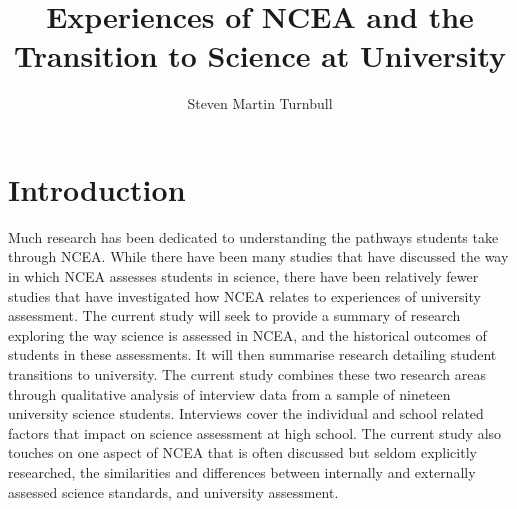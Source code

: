\documentclass[a4paper,man,natbib]{apa6}
\title{Experiences of NCEA and the Transition to Science at University}
\author{Steven Martin Turnbull}
\affiliation{School of Critical Studies in Education, Faculty of Education and Social Work, The University of Auckland}
\begin{document}
\maketitle

\section{Introduction}
Much research has been dedicated to understanding the pathways students take through NCEA. While there have been many studies that have discussed the way in which NCEA assesses students in science, there have been relatively fewer studies that have investigated how NCEA relates to experiences of university assessment. The current study will seek to provide a summary of research exploring the way science is assessed in NCEA, and the historical outcomes of students in these assessments. It will then summarise research detailing student transitions to university. The current study combines these two research areas through qualitative analysis of interview data from a sample of nineteen university science students. Interviews cover the individual and school related factors that impact on science assessment at high school. The current study also touches on one aspect of NCEA that is often discussed but seldom explicitly researched, the similarities and differences between internally and externally assessed science standards, and university assessment. 
\end{document}
